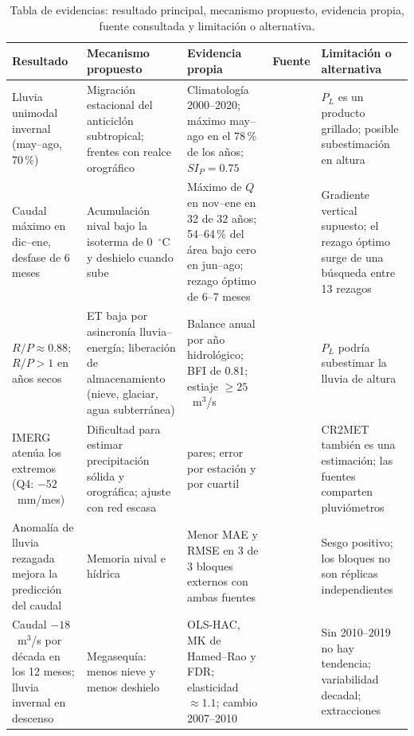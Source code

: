 \documentclass[11pt,a4paper]{article}
\newcommand{\PL}{P_L}
\newcommand{\Qm}{Q}
\begin{document}
\begin{table}[H]
\centering\scriptsize
\caption{Tabla de evidencias: resultado principal, mecanismo propuesto, evidencia propia, fuente consultada y limitación o alternativa.}
\label{tab:evidencias}
\begin{tabularx}{\textwidth}{>{\raggedright\arraybackslash}p{2.6cm}>{\raggedright\arraybackslash}X>{\raggedright\arraybackslash}X>{\raggedright\arraybackslash}p{2.0cm}>{\raggedright\arraybackslash}X}
\toprule
Resultado & Mecanismo propuesto & Evidencia propia & Fuente & Limitación o alternativa \\
\midrule
Lluvia unimodal invernal (may--ago, 70\,\%) & Migración estacional del anticiclón subtropical; frentes con realce orográfico & Climatología 2000--2020; máximo may--ago en el 78\,\% de los años; $SI_P=0.75$ & \citep{FalveyGarreaud2007,Viale2011,Garreaud2009} & $\PL$ es un producto grillado; posible subestimación en altura \\
Caudal máximo en dic--ene, desfase de 6 meses & Acumulación nival bajo la isoterma de 0~$^\circ$C y deshielo cuando sube & Máximo de $\Qm$ en nov--ene en 32 de 32 años; 54--64\,\% del área bajo cero en jun--ago; rezago óptimo de 6--7 meses & \citep{Masiokas2006,AlvarezGarreton2018} & Gradiente vertical supuesto; el rezago óptimo surge de una búsqueda entre 13 rezagos \\
$R/P\approx0.88$; $R/P>1$ en años secos & ET baja por asincronía lluvia--energía; liberación de almacenamiento (nieve, glaciar, agua subterránea) & Balance anual por año hidrológico; BFI de 0.81; estiaje $\geq25$~m$^3$/s & \citep{Ayala2020,AlvarezGarreton2021} & $\PL$ podría subestimar la lluvia de altura \\
IMERG atenúa los extremos (Q4: $-52$~mm/mes) & Dificultad para estimar precipitación sólida y orográfica; ajuste con red escasa & 238 pares; error por estación y por cuartil & \citep{Rojas2021,Zambrano2017,Tian2018} & CR2MET también es una estimación; las fuentes comparten pluviómetros \\
Anomalía de lluvia rezagada mejora la predicción del caudal & Memoria nival e hídrica & Menor MAE y RMSE en 3 de 3 bloques externos con ambas fuentes & \citep{Klemes1986,AlvarezGarreton2021} & Sesgo positivo; los bloques no son réplicas independientes \\
Caudal $-18$~m$^3$/s por década en los 12 meses; lluvia invernal en descenso & Megasequía: menos nieve y menos deshielo & OLS-HAC, MK de Hamed--Rao y FDR; elasticidad $\approx1.1$; cambio 2007--2010 & \citep{Garreaud2017,Garreaud2020,Amirthanathan2023} & Sin 2010--2019 no hay tendencia; variabilidad decadal; extracciones \\

\end{tabularx}
\end{table}
\end{document}
